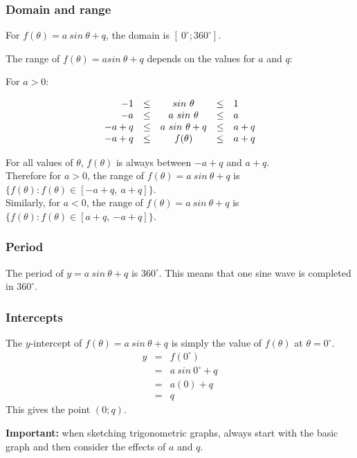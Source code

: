 \subsubsection*{Domain and range}
\nopagebreak
For $f(\theta) = a~sin~\theta + q$, the domain is $[~0^{\circ}; 360^{\circ}]$. \par
The range of $f(\theta )=asin~\theta +q$ depends on the values for $a$ and $q$:\par 
For $a>0$:\par 
\nopagebreak\noindent{}
\begin{equation*}
  \begin{array}{rcccl}
    \hfill   -1 & \leq &  sin~\theta     & \leq & 1   \hfill \\
    \hfill   -a & \leq & a~sin~\theta     & \leq & a   \hfill \\
    \hfill -a+q & \leq & a~sin~\theta + q & \leq & a+q \hfill \\
    \hfill -a+q & \leq &  f(\theta)      & \leq & a+q \hfill 
  \end{array}
\end{equation*}
\par
For all values of $\theta$, $f(\theta)$ is always between $-a+q$ and
$a+q$.\\

Therefore for $a>0$, the range of $f(\theta )=a~sin~\theta +q$ is
$\{f(\theta ):f(\theta )\in [-a+q,~a+q]\}$.\\

Similarly, for $a<0$, the range of $f(\theta )=a~sin~\theta +q$ is
$\{f(\theta ):f(\theta )\in [a+q,~{-a}+q]\}$.



\subsubsection*{Period}
The period of $y=a~sin~\theta+q$ is $360^{\circ}$. This means that one sine wave is completed in $360^{\circ}$. 

\subsubsection*{Intercepts}
\nopagebreak
The $y$-intercept of $f(\theta )=a~sin~\theta+q$ is simply the value of $f(\theta )$ at $\theta =0^{\circ }$.
\begin{eqnarray*}
  y & = & f(0^{\circ }) \\
    & = & a~sin~ 0^{\circ } + q \\
    & = & a(0) + q \\
    & = & q
\end{eqnarray*}
This gives the point $(0;q)$.
\par
\textbf{Important:} when sketching trigonometric graphs, always start with the basic graph and then consider the effects of $a$ and $q$.

